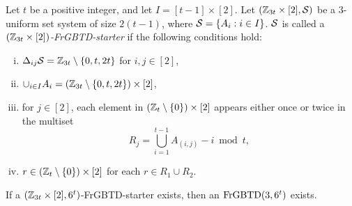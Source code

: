 \documentclass[draft, 11pt]{article}
\begin{document}
                                                       
\begin{definition}\label{defn:fgbtdstarter}
Let $t$ be a positive integer, and let $I=[t-1]\times[2]$.
Let $(\mathbb Z_{3t}\times[2],\mathcal S)$ be a $3$-uniform set system
of size $2(t-1)$, where $\mathcal S=\{A_i:i\in I\}$. $\mathcal S$ is called a
{\em $(\mathbb Z_{3t}\times[2])$-FrGBTD-starter} if the following conditions hold:
\begin{enumerate}[(i)]
\item $\Delta_{ij}\mathcal S=\mathbb Z_{3t}\setminus\{0,t,2t\}$ for $i,j\in [2]$,
\item $\cup_{i\in I} A_i = (\mathbb Z_{3t}\setminus\{0,t,2t\})\times[2]$,
\item for $j\in[2]$, each element in $(\mathbb Z_t\setminus\{0\})\times[2]$ appears either once or twice in the multiset
\begin{equation*}
R_j = \bigcup_{i=1}^{t-1} A_{(i,j)}-i\bmod t,
\end{equation*}
\item $r\in (\mathbb Z_t\setminus\{0\})\times[2]$ for each $r\in R_1\cup R_2$.
\end{enumerate}
\end{definition}


\begin{proposition}\label{prop:fgbtdstarter}
If a $(\mathbb Z_{3t}\times[2],6^t)$-FrGBTD-starter exists, 
then an ${\rm FrGBTD}(3,6^t)$ exists.
\end{proposition}
\end{document}
